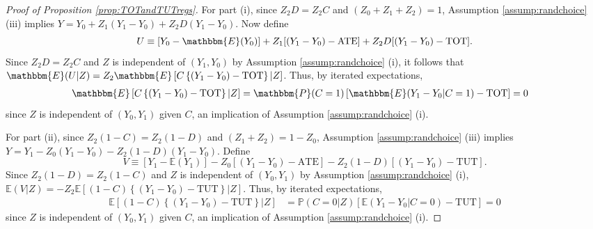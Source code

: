 \begin{appendix}
\begin{proof}[Proof of Proposition \ref{prop:TOTandTUTregs}]
For part (i), since $Z_2 D = Z_2 C$ and $(Z_0 + Z_1 + Z_2) = 1$, Assumption \ref{assump:randchoice} (iii) implies $Y= Y_0 + Z_1 (Y_1 - Y_0) + Z_2D(Y_1 - Y_0)$.
Now define 
\[
U \equiv [Y_0 - \mathbbm{E}(Y_0)] + Z_1[(Y_1 - Y_0) - \text{ATE}] + Z_2 D[(Y_1 - Y_0) - \text{TOT}].
\]
Since $Z_2 D = Z_2 C$ and $Z$ is independent of $(Y_1, Y_0)$ by Assumption \ref{assump:randchoice} (i), it follows that $\mathbbm{E}(U|Z) = Z_2 \mathbbm{E}\left[C\left\{(Y_1 - Y_0) - \text{TOT}\right\}|Z\right]$.
Thus, by iterated expectations,
\begin{align*}
\mathbbm{E}\left[C\left\{(Y_1 - Y_0) - \text{TOT}\right\}|Z\right] 
&= \mathbbm{P}(C=1)\left[\mathbbm{E}(Y_1 - Y_0|C=1) - \text{TOT} \right]=0
\end{align*}
since $Z$ is independent of $(Y_0, Y_1)$ given $C$, an implication of Assumption \ref{assump:randchoice} (i).

For part (ii), since $Z_2(1 - C)= Z_2(1 - D)$ and $(Z_1 + Z_2) = 1 - Z_0$,  Assumption \ref{assump:randchoice} (iii) implies $Y= Y_1 - Z_0 (Y_1 - Y_0) - Z_2(1 - D) (Y_1 - Y_0)$.
Define 
\[
V \equiv [Y_1 - \mathbb{E}(Y_1)] - Z_0[(Y_1 - Y_0) - \text{ATE}] - Z_2(1 - D)[(Y_1 - Y_0) - \text{TUT}].
\]
Since $Z_2(1 - D) = Z_2 (1 - C)$ and $Z$ is independent of $(Y_0, Y_1)$ by Assumption \ref{assump:randchoice} (i),
$\mathbb{E}(V|Z) = -Z_2\mathbb{E}[(1 - C)\left\{(Y_1 - Y_0) - \text{TUT}\right\}|Z]$.
Thus, by iterated expectations,
\begin{align*}
\mathbb{E}[(1 - C)\left\{(Y_1 - Y_0) - \text{TUT}\right\}|Z]
&= \mathbb{P}(C=0|Z) \left[ \mathbb{E}(Y_1 - Y_0|C=0) - \text{TUT}\right] = 0
\end{align*}
since $Z$ is independent of $(Y_0, Y_1)$ given $C$, an implication of Assumption \ref{assump:randchoice} (i).
\end{proof}


\end{appendix}
